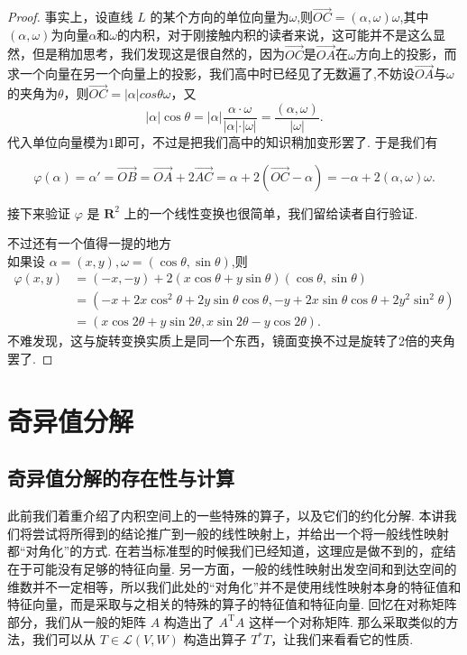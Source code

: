\begin{proof}
    事实上，设直线 $L$ 的某个方向的单位向量为$\omega$,则$\vec{OC}=(\alpha,\omega)\omega$,其中$(\alpha,\omega)$为向量$\alpha$和$\omega$的内积，对于刚接触内积的读者来说，这可能并不是这么显然，但是稍加思考，我们发现这是很自然的，因为$\vec{OC}$是$\vec{OA}$在$\omega$方向上的投影，而求一个向量在另一个向量上的投影，我们高中时已经见了无数遍了,不妨设$\vec{OA}$与$\omega$的夹角为$\theta$，则$\vec{OC}=\vert\alpha \vert cos\theta\omega$，又
    \[
        \vert\alpha \vert\cos\theta=\vert\alpha \vert\dfrac{\alpha\cdot\omega}{\vert \alpha\vert\cdot\vert\omega\vert}=\dfrac{(\alpha,\omega)}{\vert\omega\vert}.
    \]
    代入单位向量模为$1$即可，不过是把我们高中的知识稍加变形罢了. 于是我们有

    \[
    \varphi(\alpha)=\alpha'=\vec{OB}=\vec{OA}+2\vec{AC}= \alpha + 2(\vec{OC}-\alpha)=-\alpha+2(\alpha,\omega)\omega.
    \]

    接下来验证 $\varphi$ 是 $\mathbf{R}^2$ 上的一个线性变换也很简单，我们留给读者自行验证.

    不过还有一个值得一提的地方\\
    如果设 $\alpha = (x,y),\omega =(\cos \theta,\sin \theta)$,则
    \begin{align*}
        \varphi(x,y)&=(-x,-y)+2(x\cos\theta+y\sin\theta)(\cos \theta,\sin \theta)\\
        &=(-x + 2x \cos^2 \theta + 2y \sin \theta \cos \theta, -y + 2x \sin \theta \cos \theta + 2y^2 \sin^2 \theta)\\
        &=(x \cos 2\theta + y \sin 2\theta, x \sin 2\theta - y \cos 2\theta).
    \end{align*}
    不难发现，这与旋转变换实质上是同一个东西，镜面变换不过是旋转了2倍的夹角罢了.
\end{proof}

\section{奇异值分解}

\subsection{奇异值分解的存在性与计算}

此前我们着重介绍了内积空间上的一些特殊的算子，以及它们的约化分解. 本讲我们将尝试将所得到的结论推广到一般的线性映射上，并给出一个将一般线性映射都``对角化''的方式. 在若当标准型的时候我们已经知道，这理应是做不到的，症结在于可能没有足够的特征向量. 另一方面，一般的线性映射出发空间和到达空间的维数并不一定相等，所以我们此处的``对角化''并不是使用线性映射本身的特征值和特征向量，而是采取与之相关的特殊的算子的特征值和特征向量. 回忆在对称矩阵部分，我们从一般的矩阵 $A$ 构造出了 $A^{\mathrm{T}}A$ 这样一个对称矩阵. 那么采取类似的方法，我们可以从 $T \in \mathcal{L}(V, W)$ 构造出算子 $T^*T$，让我们来看看它的性质.

